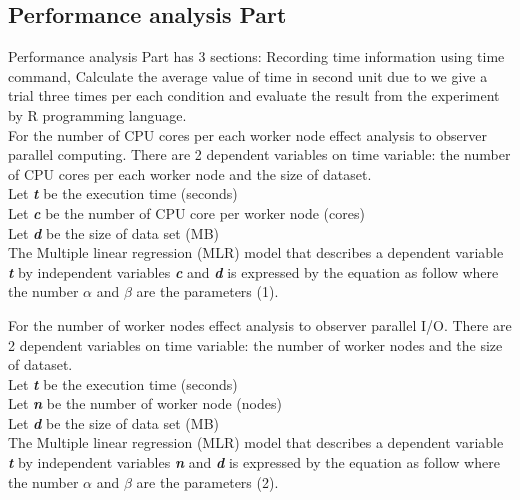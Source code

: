 \documentclass[conference]{IEEEtran}
\begin{document}
\subsection{Performance analysis Part}
Performance analysis Part has 3 sections: Recording time information using time command,  Calculate the average value of time in second unit due to we give a trial three times per each condition and evaluate the result from the experiment by R programming language.\\
\indent For the number of CPU cores per each worker node effect analysis to observer parallel computing. There are 2 dependent variables on time variable: the number of CPU cores per each worker node and the size of dataset.\\
\indent Let \textbf{\textit{t}} be the execution time (seconds)\\
\indent Let \textbf{\textit{c}} be the number of CPU core per worker node (cores)\\
\indent Let \textbf{\textit{d}} be the size of data set (MB)\\
\indent The Multiple linear regression (MLR) model that describes a dependent variable  \textbf{\textit{t}} by independent variables \textbf{\textit{c}} and  \textbf{\textit{d}} is expressed by the equation as follow where the number \begin{math}\alpha\end{math} and \begin{math}\beta\end{math} are the parameters (1).

\indent For the number of worker nodes effect analysis to observer parallel I/O. There are 2 dependent variables on time variable: the number of worker nodes and the size of dataset.\\
\indent Let \textbf{\textit{t}} be the execution time (seconds)\\
\indent Let \textbf{\textit{n}} be the number of worker node (nodes)\\
\indent Let \textbf{\textit{d}} be the size of data set (MB)\\
\indent The Multiple linear regression (MLR) model that describes a dependent variable  \textbf{\textit{t}} by independent variables \textbf{\textit{n}} and  \textbf{\textit{d}} is expressed by the equation as follow where the number \begin{math}\alpha\end{math} and \begin{math}\beta\end{math} are the parameters (2).
\end{document}
